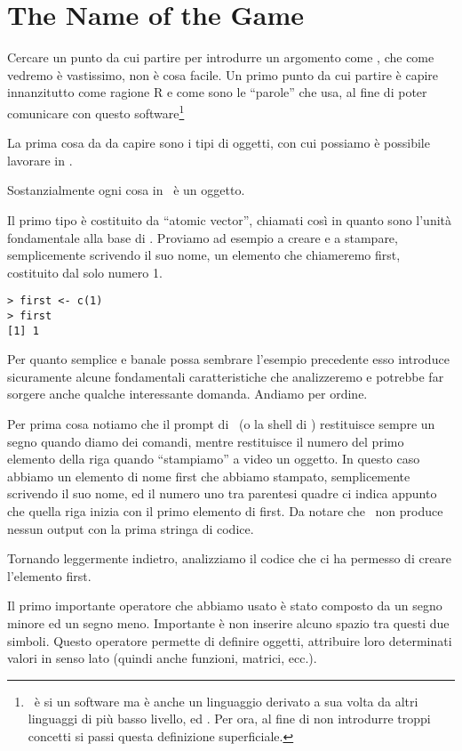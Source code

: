 \section{The Name of the Game}

Cercare un punto da cui partire per introdurre un argomento come \erre, che come vedremo è vastissimo, non è cosa facile.
Un primo punto da cui partire è capire innanzitutto come ragione R e come sono le ``parole'' che usa, al fine di poter comunicare con questo software\footnote{\erre\ è si un software ma è anche un linguaggio derivato a sua volta da altri linguaggi di più basso livello,  ed . Per ora, al fine di non introdurre troppi concetti si passi questa definizione superficiale.}

La prima cosa da da capire sono i tipi di oggetti, con cui possiamo è possibile lavorare in \erre.

Sostanzialmente ogni cosa in \erre\ è un oggetto.

Il primo tipo è costituito da ``atomic vector'', chiamati così in quanto sono l'unità fondamentale alla base di \erre.
Proviamo ad esempio a creare e a stampare, semplicemente scrivendo il suo nome, un elemento che chiameremo first, costituito dal solo numero 1.

\begin{lstlisting}
> first <- c(1)
> first
[1] 1
\end{lstlisting}

Per quanto semplice e banale possa sembrare l'esempio precedente esso introduce sicuramente alcune fondamentali caratteristiche che analizzeremo e potrebbe far sorgere anche qualche interessante domanda. Andiamo per ordine.

Per prima cosa notiamo che il prompt di \erre\ (o la shell di \erre) restituisce sempre un segno \cod{>} quando diamo dei comandi, mentre restituisce il numero del primo elemento della riga quando ``stampiamo'' a video un oggetto. In questo caso abbiamo un elemento di nome first che abbiamo stampato, semplicemente scrivendo il suo nome, ed il numero uno tra parentesi quadre ci indica appunto che quella riga inizia con il primo elemento di first. Da notare che \erre\ non produce nessun output con la prima stringa di codice.

Tornando leggermente indietro, analizziamo il codice che ci ha permesso di creare l'elemento first.

Il primo importante operatore che abbiamo usato è stato \cod{<-} composto da un segno minore ed un segno meno. Importante è non inserire alcuno spazio tra questi due simboli. Questo operatore permette di definire oggetti, attribuire loro determinati valori in senso lato (quindi anche funzioni, matrici, ecc.).


